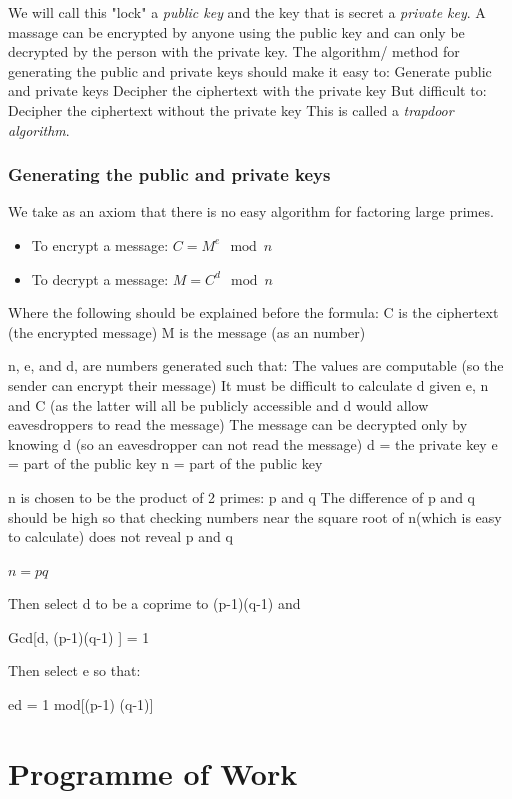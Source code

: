 \documentclass{article}
\begin{document}
We will call this "lock" a \textit{public key} and the key that is secret a \textit{private key}. A massage can be encrypted by anyone using the public key and can only be decrypted by the person with the private key.
The algorithm/ method for generating the public and private keys should make it easy to:
	Generate public and private keys
	Decipher the ciphertext with the private key
But difficult to:
	Decipher the ciphertext without the private key
This is called a \textit{trapdoor algorithm}.

\subsubsection{Generating the public and private keys}
We take as an axiom that there is no easy algorithm for factoring large primes.
\begin{itemize}

   \item To encrypt a message:
      $ C = M^e \mod n $
	
		
   \item To decrypt a message:
      $ M = C^d \mod n $
\end{itemize}

Where the following should be explained before the formula:
C is the ciphertext (the encrypted message)
M is the message (as an number)

n, e, and d, are numbers generated such that:
	The values are computable (so the sender can encrypt their message)
	It must be difficult to calculate d given e, n and C (as the latter will all be publicly accessible and d would allow eavesdroppers to read the message)
	The message can be decrypted only by knowing d (so an eavesdropper can not read the message)
	d = the private key
	e = part of the public key
	n = part of the public key

n is chosen to be the product of 2 primes: p and q
The difference of p and q should be high so that checking numbers near the square root of n(which is easy to calculate) does not reveal p and q

$ n = pq $

Then select d to be a coprime to (p-1)(q-1) and

Gcd[d, (p-1)(q-1) ] = 1

Then select e so that:

 ed = 1 mod[(p-1) (q-1)]

\section{Programme of Work}
\end{document}
